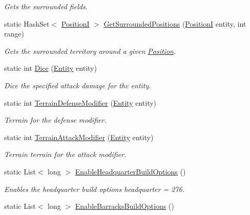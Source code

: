 \begin{DoxyCompactItemize}
\begin{DoxyCompactList}\small\item\em Gets the surrounded fields. \end{DoxyCompactList}\item 
static Hash\+Set$<$ \hyperlink{classCore_1_1Models_1_1PositionI}{Position\+I} $>$ \hyperlink{classCore_1_1Models_1_1LogicRules_acbb757cd665530aeb298e4a467051ae8}{Get\+Surrounded\+Positions} (\hyperlink{classCore_1_1Models_1_1PositionI}{Position\+I} entity, int range)
\begin{DoxyCompactList}\small\item\em Gets the surrounded territory around a given \hyperlink{classCore_1_1Models_1_1Position}{Position}. \end{DoxyCompactList}\item 
static int \hyperlink{classCore_1_1Models_1_1LogicRules_a97d3cb9e89712688aadd9a55c33b1131}{Dice} (\hyperlink{classCore_1_1Models_1_1Entity}{Entity} entity)
\begin{DoxyCompactList}\small\item\em Dice the specified attack damage for the entity. \end{DoxyCompactList}\item 
static int \hyperlink{classCore_1_1Models_1_1LogicRules_afb1653a247c550abefe670ca433e0ea2}{Terrain\+Defense\+Modifier} (\hyperlink{classCore_1_1Models_1_1Entity}{Entity} entity)
\begin{DoxyCompactList}\small\item\em Terrain for the defense modifier. \end{DoxyCompactList}\item 
static int \hyperlink{classCore_1_1Models_1_1LogicRules_aa4b7023024d0ec1bff7671f7175fa748}{Terrain\+Attack\+Modifier} (\hyperlink{classCore_1_1Models_1_1Entity}{Entity} entity)
\begin{DoxyCompactList}\small\item\em Terrain terrain for the attack modifier. \end{DoxyCompactList}\item 
static List$<$ long $>$ \hyperlink{classCore_1_1Models_1_1LogicRules_ad57cefd425a49ecd97447217eddeeadd}{Enable\+Headquarter\+Build\+Options} ()
\begin{DoxyCompactList}\small\item\em Enables the headquarter build options headquarter = 276. \end{DoxyCompactList}\item 
static List$<$ long $>$ \hyperlink{classCore_1_1Models_1_1LogicRules_ad990bb1ba29df6cc6236d7264d598822}{Enable\+Barracks\+Build\+Options} ()

\end{DoxyCompactItemize}
